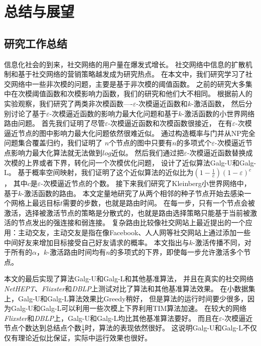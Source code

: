 \chapter{总结与展望}
\section{研究工作总结}
信息化社会的到来，社交网络的用户量在爆发式增长。
社交网络中信息的扩散机制和基于社交网络的营销策略越发成为研究热点。
在本文中，我们研究学习了社交网络中一些非次模的问题，主要是基于非次模的阈值函数。
之前的研究大多集中在次模阈值函数和次模影响力函数，我们的研究和他们大不相同。
根据前人的实验观察，我们研究了两类非次模函数----$\varepsilon$-次模逼近函数和$k$-激活函数，
然后分别讨论了基于$\varepsilon$-次模逼近函数的影响力最大化问题和基于$k$-激活函数的小世界网络路由问题。
首先我们证明了尽管$\varepsilon$-次模逼近函数和次模函数很接近，
在有$\varepsilon$-次模逼近节点的图中影响力最大化问题依然很难近似。
通过构造概率与门并从NP完全问题集合覆盖归约，我们证明了
$n$个节点的图中只要有$n$的多项式个$\varepsilon$-次模逼近节点影响力最大化算法就无法做到$log$近似。
然后我们通过把$\varepsilon$-次模逼近函数替换成次模的上界或者下界，转化问一个次模优化问题，
设计了近似算法\textsf{Galg-U}和\textsf{Galg-L}。
基于概率空间映射，我们证明了这个近似算法的近似比为$(1-\frac{1}{e})(1-\varepsilon)^c$，
其中$c$是$\varepsilon$-次模逼近节点的个数。
接下来我们研究了Kleinberg小世界网络中，基于$k$-激活函数的路由。
本文定量地研究了从两个相邻的种子节点开始去感染一个网格上最远目标$t$需要的步数，也就是路由时间。
在每一步，只有一个节点会被激活，选择被激活节点的策略是分散式的，也就是路由选择策略只能基于当前被激活的节点发出的强连接和弱连接。
复杂路由比较像社交网站上最近提出的一个应用：主动交友，主动交友是指在像Facebook、人人网等社交网站上通过添加一些中间好友来增加目标接受自己好友请求的概率\cite{YangHLC13}。
本文指出与$k$-激活传播不同，对于所有的$\alpha$，$k$-激活路由时间均有$n$的多项式的下界，即使每一步允许激活多个节点。


本文的最后实现了算法\textsf{Galg-U}和\textsf{Galg-L}和其他基准算法，
并且在真实的社交网络{\em NetHEPT}、{\em Flixster}和{\em DBLP}上测试对比了算法和其他基准算法效果。
在小数据集上，\textsf{Galg-U}和\textsf{Galg-L}算法效果比\textsf{Greedy}稍好，
但是算法的运行时间要少很多，因为\textsf{Galg-U}和\textsf{Galg-L}可以利用一些次模上下界利用\textsf{TIM}算法加速。
在较大的网络{\em Flixster}和{\em DBLP}上，\textsf{Galg-U}和\textsf{Galg-L}均比其他基准算法要好。
而且在$\varepsilon$-次模逼近节点个数达到总结点个数$\frac{1}{3}$时，算法的表现依然很好。
这说明\textsf{Galg-U}和\textsf{Galg-L}不仅仅有理论近似比保证，实际中运行效果也很好。




